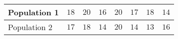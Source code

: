 \begin{tabular}{|l|c|c|c|c|c|c|c|}
\hline
Population 1 & $18$ & $20$ & $16$ & $20$ & $17$ & $18$ & $14$ \\
\hline
Population 2 & $17$ & $18$ & $14$ & $20$ & $14$ & $13$ & $16$ \\
\hline
\end{tabular}
